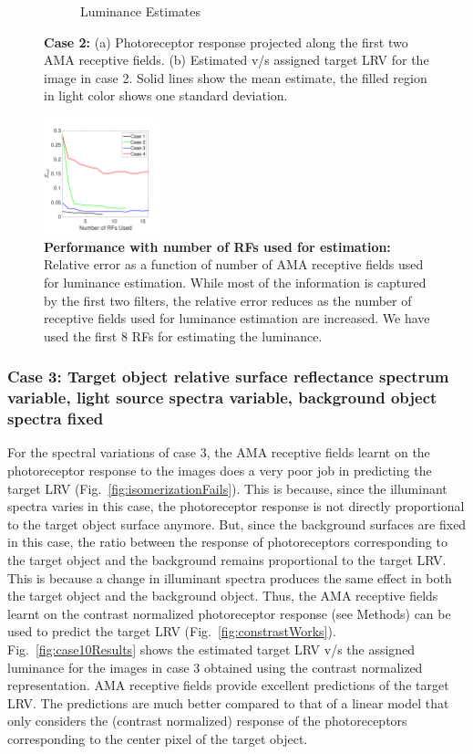\documentclass{jov}
\begin{document}
\begin{figure}
\begin{subfigure}[b]{0.3 \textwidth}
        \caption{Luminance Estimates}
        \label{fig:case2Estimates}
    \end{subfigure}
    \caption{{\bf Case 2:} (a) Photoreceptor response projected along the first two AMA receptive fields. (b) Estimated v/s assigned target LRV for the image in case 2. Solid lines show the mean estimate, the filled region in light color  shows one standard deviation.}
\label{fig:case2Results}
\end{figure}

\begin{figure}
\centering
\includegraphics[width=0.3\textwidth]{../Figures/Figure11/Figure11.pdf}
\caption{{\bf Performance with number of RFs used for estimation:} Relative error as a function of number of AMA receptive fields used for luminance estimation. While most of the information is captured by the first two filters, the relative error reduces as the number of receptive fields used for luminance estimation are increased. We have used the first 8 RFs for estimating the luminance.}
\label{fig:ErrorVsNFilters}
\end{figure}

\subsubsection{Case 3: Target object relative surface reflectance spectrum variable, light source spectra variable, background object spectra fixed}
For the spectral variations of case 3, the AMA receptive fields learnt on the photoreceptor response to the images does a very poor job in predicting the target LRV (Fig.~\ref{fig:isomerizationFails}). 
This is because, since the illuminant spectra varies in this case, the photoreceptor response is not directly proportional to the target object surface anymore. 
But, since the background surfaces are fixed in this case, the ratio between the response of  photoreceptors corresponding to the target object and the background remains proportional to the target LRV. 
This is because a change in illuminant spectra produces the same effect in both the target object and the background object. 
Thus, the AMA receptive fields learnt on the contrast normalized photoreceptor response (see Methods) can be used to predict the target LRV (Fig.~\ref{fig:constrastWorks}). 
Fig.~\ref{fig:case10Results} shows the estimated target LRV v/s the assigned luminance for the images in case 3 obtained using the contrast normalized representation. 
AMA receptive fields provide excellent predictions of the target LRV. 
The predictions are much better compared to that of a linear model that only considers the (contrast normalized) response of the photoreceptors corresponding to the center pixel of the target object.
\end{document}
